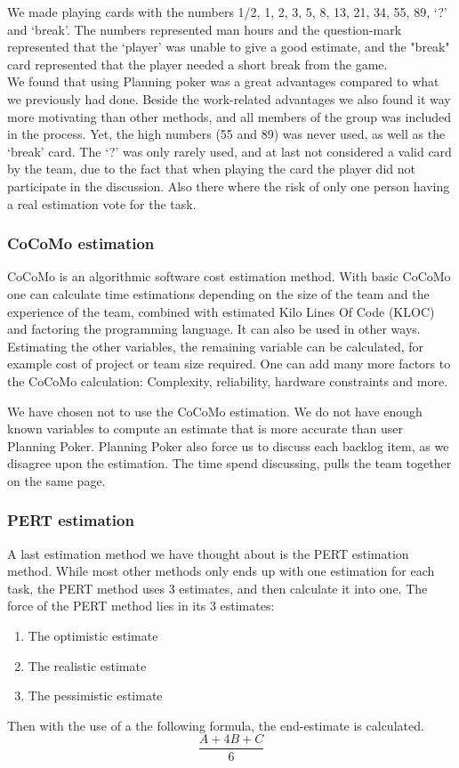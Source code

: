We made playing cards with the numbers 1/2, 1, 2, 3, 5, 8, 13, 21, 34, 55, 89, `?' and `break'. The numbers represented man hours and the question-mark represented that the `player' was unable to give a good estimate, and the "break" card represented that the player needed a short break from the game.\\
We found that using Planning poker was a great advantages compared to what we previously had done. Beside the work-related advantages we also found it way more motivating than other methods, and all members of the group was included in the process. Yet, the high numbers (55 and 89) was never used, as well as the `break' card. The `?' was only rarely used, and at last not considered a valid card by the team, due to the fact that when playing the card the player did not participate in the discussion. Also there where the risk of only one person having a real estimation vote for the task.

\subsubsection{CoCoMo estimation}
CoCoMo is an algorithmic software cost estimation method. With basic CoCoMo one can calculate time estimations depending on the size of the team and the experience of the team, combined with estimated Kilo Lines Of Code (KLOC) and factoring the programming language. It can also be used in other ways. Estimating the other variables, the remaining variable can be calculated, for example cost of project or team size required. One can add many more factors to the CoCoMo calculation: Complexity, reliability, hardware constraints and more.

We have chosen not to use the CoCoMo estimation. We do not have enough known variables to compute an estimate that is more accurate than user Planning Poker. Planning Poker also force us to discuss each backlog item, as we disagree upon the estimation. The time spend discussing, pulls the team together on the same page. 

\subsubsection{PERT estimation}
A last estimation method we have thought about is the PERT estimation method. While most other methods only ends up with one estimation for each task, the PERT method uses 3 estimates, and then calculate it into one. The force of the PERT method lies in its 3 estimates:
\begin{enumerate}[label=\Alph{*}\hspace{0.8em}]
	\item The optimistic estimate
	\item The realistic estimate
	\item The pessimistic estimate
\end{enumerate}
Then with the use of a the following formula, the end-estimate is calculated.
\begin{equation}
	\frac{A+4B+C}{6}
\end{equation}

